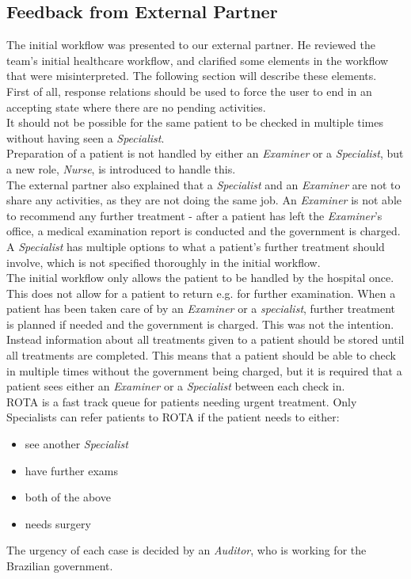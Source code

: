 \subsection{Feedback from External Partner}
The initial workflow was presented to our external partner. He reviewed the team’s initial healthcare workflow, and clarified some elements in the workflow that were misinterpreted. The following section will describe these elements.\\

First of all, response relations should be used to force the user to end in an accepting state where there are no pending activities.\\

It should not be possible for the same patient to be checked in multiple times without having seen a \textit{Specialist}.\\

Preparation of a patient is not handled by either an \textit{Examiner} or a \textit{Specialist}, but a new role, \textit{Nurse}, is introduced to handle this. \\

The external partner also explained that a \textit{Specialist} and an \textit{Examiner} are not to share any activities, as they are not doing the same job. An \textit{Examiner} is not able to recommend any further treatment - after a patient has left the \textit{Examiner}’s office, a medical examination report is conducted and the government is charged. A \textit{Specialist} has multiple options to what a patient’s further treatment should involve, which is not specified thoroughly in the initial workflow. \\

The initial workflow only allows the patient to be handled by the hospital once. This does not allow for a patient to return e.g. for further examination. When a patient has been taken care of by an \textit{Examiner} or a \textit{specialist}, further treatment is planned if needed and the government is charged. This was not the intention. Instead information about all treatments given to a patient should be stored until all treatments are completed. This means that a patient should be able to check in multiple times without the government being charged, but it is required that a patient sees either an \textit{Examiner} or a \textit{Specialist} between each check in. \\

ROTA is a fast track queue for patients needing urgent treatment. Only Specialists can refer patients to ROTA if the patient needs to either:
\begin{itemize}
\item see another \textit{Specialist}
\item have further exams
\item both of the above
\item needs surgery
\end{itemize}
The urgency of each case is decided by an \textit{Auditor}, who is working for the Brazilian government. 